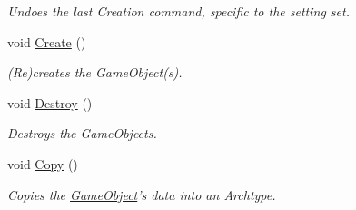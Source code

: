\begin{DoxyCompactItemize}
\begin{DoxyCompactList}\small\item\em Undoes the last Creation command, specific to the setting set. \end{DoxyCompactList}\item 
\hypertarget{classDCEngine_1_1CommandObjectCreation_ad76e4f90f29fe4bef214c624d2775dc9}{void \hyperlink{classDCEngine_1_1CommandObjectCreation_ad76e4f90f29fe4bef214c624d2775dc9}{Create} ()}\label{classDCEngine_1_1CommandObjectCreation_ad76e4f90f29fe4bef214c624d2775dc9}

\begin{DoxyCompactList}\small\item\em (Re)creates the Game\-Object(s). \end{DoxyCompactList}\item 
\hypertarget{classDCEngine_1_1CommandObjectCreation_aa12c1f9d71af2b76f6959129b74ea848}{void \hyperlink{classDCEngine_1_1CommandObjectCreation_aa12c1f9d71af2b76f6959129b74ea848}{Destroy} ()}\label{classDCEngine_1_1CommandObjectCreation_aa12c1f9d71af2b76f6959129b74ea848}

\begin{DoxyCompactList}\small\item\em Destroys the Game\-Objects. \end{DoxyCompactList}\item 
\hypertarget{classDCEngine_1_1CommandObjectCreation_ab54719033edf413729904e89a2bfacc1}{void \hyperlink{classDCEngine_1_1CommandObjectCreation_ab54719033edf413729904e89a2bfacc1}{Copy} ()}\label{classDCEngine_1_1CommandObjectCreation_ab54719033edf413729904e89a2bfacc1}

\begin{DoxyCompactList}\small\item\em Copies the \hyperlink{classDCEngine_1_1GameObject}{Game\-Object}'s data into an Archtype. \end{DoxyCompactList}\end{DoxyCompactItemize}
